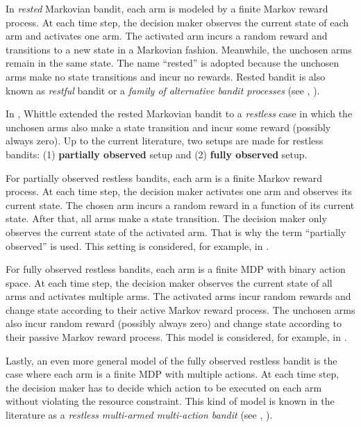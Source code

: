 In \emph{rested} Markovian bandit, each arm is modeled by a finite Markov reward process. At each time step, the decision maker observes the current state of each arm and activates one arm.
The activated arm incurs a random reward and transitions to a new state in a Markovian fashion.
Meanwhile, the unchosen arms remain in the same state.
The name ``rested'' is adopted because the unchosen arms make no state transitions and incur no rewards.
Rested bandit is also known as \emph{restful} bandit or a \emph{family of alternative bandit processes} (see \eg, \cite{gittins1979bandit,katehakis1987multi,duff1995q,tekin2010online,gittins2011multi}).

In \cite{whittle1988restless}, Whittle extended the rested Markovian bandit to a \emph{restless} case in which
the unchosen arms also make a state transition and incur some reward (possibly always zero).
Up to the current literature, two setups are made for restless bandits: (1) \textbf{partially observed} setup and (2) \textbf{fully observed} setup.

For partially observed restless bandits, each arm is a finite Markov reward process.
At each time step, the decision maker activates one arm and observes its current state.
The chosen arm incurs a random reward in a function of its current state.
After that, all arms make a state transition.
The decision maker only observes the current state of the activated arm.
That is why the term ``partially observed'' is used.
This setting is considered, for example, in \cite{ahmad2009multi,ortner2012regret, jung2019regret, akbarzadeh2019dynamic, wang2020restless}.

For fully observed restless bandits, each arm is a finite MDP with binary action space.
At each time step, the decision maker observes the current state of all arms and activates multiple arms.
The activated arms incur random rewards and change state according to their active Markov reward process.
The unchosen arms also incur random reward (possibly always zero) and change state according to their passive Markov reward process.
This model is considered, for example, in \cite{whittle1996optimal,akbarzadeh2019restless,gast2020exponential,dahiya2022scalable}.

Lastly, an even more general model of the fully observed restless bandit is the case where each arm is a finite MDP with multiple actions.
At each time step, the decision maker has to decide which action to be executed on each arm without violating the resource constraint.
This kind of model is known in the literature as a \emph{restless multi-armed multi-action bandit} (see \eg, \cite{hodge2015asymptotic,killian2021beyond}).

